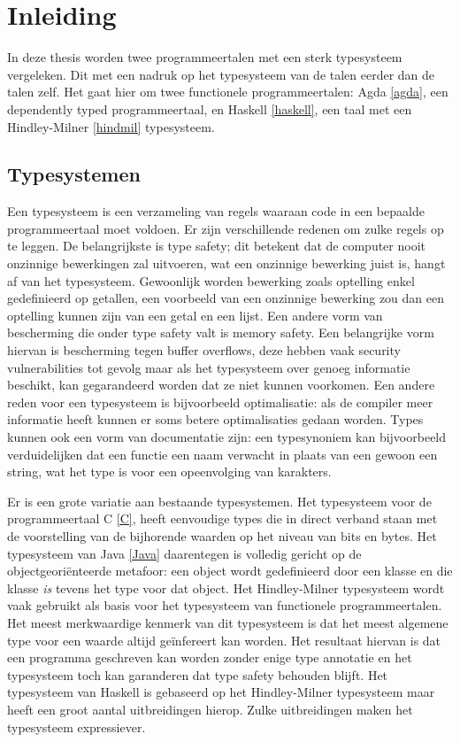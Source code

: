 \chapter{Inleiding}
\label{inleiding}

In deze thesis worden twee programmeertalen met een sterk typesysteem
vergeleken. Dit met een nadruk op het typesysteem van de talen eerder dan de
talen zelf. Het gaat hier om twee functionele programmeertalen: Agda
\ref{agda}, een dependently typed programmeertaal, en Haskell \ref{haskell},
een taal met een Hindley-Milner \ref{hindmil} typesysteem.


\section{Typesystemen}

Een typesysteem is een verzameling van regels waaraan code in een bepaalde
programmeertaal moet voldoen. Er zijn verschillende redenen om zulke regels op
te leggen. De belangrijkste is type safety; dit betekent dat de computer nooit
onzinnige bewerkingen zal uitvoeren, wat een onzinnige bewerking juist is,
hangt af van het typesysteem. Gewoonlijk worden bewerking zoals optelling enkel
gedefinieerd op getallen, een voorbeeld van een onzinnige bewerking zou dan een
optelling kunnen zijn van een getal en een lijst. Een andere vorm van
bescherming die onder type safety valt is memory safety. Een belangrijke vorm
hiervan is bescherming tegen buffer overflows, deze hebben vaak security
vulnerabilities tot gevolg maar als het typesysteem over genoeg informatie
beschikt, kan gegarandeerd worden dat ze niet kunnen voorkomen.
Een andere reden voor een typesysteem is bijvoorbeeld optimalisatie: als de
compiler meer informatie heeft kunnen er soms betere optimalisaties gedaan
worden. Types kunnen ook een vorm van documentatie zijn: een typesynoniem kan
bijvoorbeeld verduidelijken dat een functie een naam verwacht in plaats van een
gewoon een string, wat het type is voor een opeenvolging van karakters.

Er is een grote variatie aan bestaande typesystemen. Het typesysteem voor de
programmeertaal C \ref{C}, heeft eenvoudige types die in direct verband staan
met de voorstelling van de bijhorende waarden op het niveau van bits en bytes.
Het typesysteem van Java \ref{Java} daarentegen is volledig gericht op de
objectgeoriënteerde metafoor: een object wordt gedefinieerd door een klasse en
die klasse \emph{is} tevens het type voor dat object. Het Hindley-Milner
typesysteem wordt vaak gebruikt als basis voor het typesysteem van functionele
programmeertalen. Het meest merkwaardige kenmerk van dit typesysteem is dat het
meest algemene type voor een waarde altijd geïnfereert kan worden. Het
resultaat hiervan is dat een programma geschreven kan worden zonder enige type
annotatie en het typesysteem toch kan garanderen dat type safety behouden
blijft. Het typesysteem van Haskell is gebaseerd op het Hindley-Milner
typesysteem maar heeft een groot aantal uitbreidingen hierop. Zulke
uitbreidingen maken het typesysteem expressiever.


